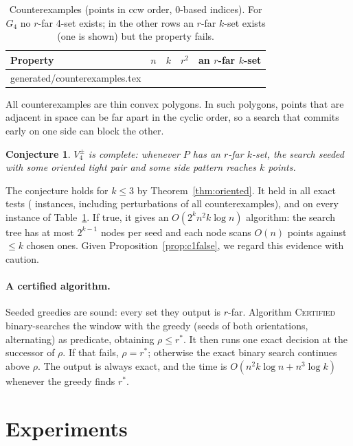 \documentclass[11pt,a4paper]{article}
\makeatletter
\newtheorem{conjecture}[theorem]{Conjecture}
\theoremstyle{definition}
\newcommand{\inputrows}[1]{\@@input #1 }
\newcommand{\opt}{r^{*}}
\makeatother
\begin{document}
\begin{table}[h]
\centering
\caption{Counterexamples (points in ccw order, $0$-based indices). For $G_4$
no $r$-far 4-set exists; in the other rows an $r$-far $k$-set exists (one is
shown) but the property fails.}
\label{tab:counter}
\small
\begin{tabular}{@{}l c c r l@{}}
\toprule
Property & $n$ & $k$ & $r^2$ & an $r$-far $k$-set \\
\midrule
\inputrows{generated/counterexamples.tex}
\bottomrule
\end{tabular}
\end{table}

All counterexamples are thin convex polygons. In such polygons, points that
are adjacent in space can be far apart in the cyclic order, so a search that
commits early on one side can block the other.

\begin{conjecture}\label{conj:v4pm}
$V_4^{\pm}$ is complete: whenever $P$ has an $r$-far $k$-set, the search
seeded with some oriented tight pair and some side pattern reaches $k$ points.
\end{conjecture}

The conjecture holds for $k\le3$ by Theorem~\ref{thm:oriented}. It held in all
\VFourPMTests{} exact tests (\VFourPMInst{} instances, including perturbations
of all counterexamples), and on every instance of Table~\ref{tab:counter}. If
true, it gives an $O(2^kn^2k\log n)$ algorithm: the search tree has at most
$2^{k-1}$ nodes per seed and each node scans $O(n)$ points against $\le k$
chosen ones. Given Proposition~\ref{prop:c1false}, we regard this evidence
with caution.

\paragraph{A certified algorithm.} Seeded greedies are sound: every set they
output is $r$-far. Algorithm \textsc{Certified} binary-searches the window with
the greedy (seeds of both orientations, alternating) as predicate, obtaining
$\rho\le\opt$. It then runs one exact decision at the successor of $\rho$. If
that fails, $\rho=\opt$; otherwise the exact binary search continues above
$\rho$. The output is always exact, and the time is
$O(n^2k\log n+n^3\log k)$ whenever the greedy finds $\opt$.

\section{Experiments}\label{sec:experiments}
\end{document}
